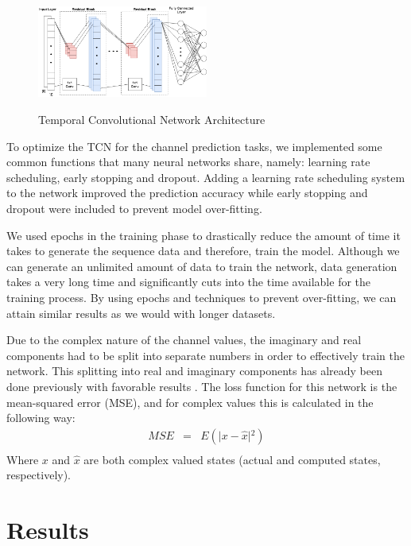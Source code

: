 \documentclass[twocolumn,letterpaper]{IEEEAerospaceCLS}  %
\begin{document}
\begin{figure}[!h]
	\centering\includegraphics[width=0.5\textwidth]{figs/TCN.png}\\
	\caption{Temporal Convolutional Network Architecture}
	\label{TCNstruct}
\end{figure}

To optimize the TCN for the channel prediction tasks, we implemented some common functions that many neural networks share, namely: learning rate scheduling, early stopping and dropout. Adding a learning rate scheduling system to the network improved the prediction accuracy while early stopping and dropout were included to prevent model over-fitting. 

We used epochs in the training phase to drastically reduce the amount of time it takes to generate the sequence data and therefore, train the model. Although we can generate an unlimited amount of data to train the network, data generation takes a very long time and significantly cuts into the time available for the training process. By using epochs and techniques to prevent over-fitting, we can attain similar results as we would with longer datasets. 

Due to the complex nature of the channel values, the imaginary and real components had to be split into separate numbers in order to effectively train the network. This splitting into real and imaginary components has already been done previously with favorable results \cite{tacspinar2010back}.  The loss function for this network is the mean-squared error (MSE), and for complex values this is calculated in the following way:
\begin{eqnarray*}
MSE&=&E(\lvert {x-\hat{x}}\rvert{^2}) \\
\end{eqnarray*}
Where $x$ and $\hat{x}$ are both complex valued states (actual and computed states, respectively). 


\section{Results}
\label{sec:results}
\end{document}

